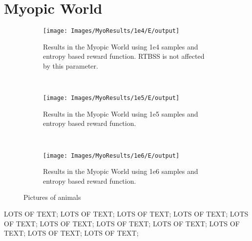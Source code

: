 \section{Myopic World}

\begin{figure}[h]
        \centering
        \begin{subfigure}[t]{0.3\textwidth}
                \texttt{[image: Images/MyoResults/1e4/E/output]}
                \caption{Results in the Myopic World using 1e4 samples and entropy based reward
                function. RTBSS is not affected by this parameter.}
                \label{fig:m4e}
        \end{subfigure}%
        ~ %
        \begin{subfigure}[t]{0.3\textwidth}
                \texttt{[image: Images/MyoResults/1e5/E/output]}
                \caption{Results in the Myopic World using 1e5 samples and entropy based reward
                function.}
                \label{fig:m5e}
        \end{subfigure}
        ~ %
        \begin{subfigure}[t]{0.3\textwidth}
                \texttt{[image: Images/MyoResults/1e6/E/output]}
                \caption{Results in the Myopic World using 1e6 samples and entropy based reward
                function.}
                \label{fig:m6e}
        \end{subfigure}
        \caption{Pictures of animals}\label{fig:me}
\end{figure}

LOTS OF TEXT; LOTS OF TEXT; LOTS OF TEXT; LOTS OF TEXT; LOTS OF TEXT; LOTS OF TEXT; LOTS OF TEXT; LOTS OF TEXT; LOTS OF TEXT; LOTS OF TEXT; LOTS OF TEXT;


